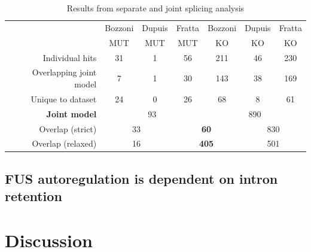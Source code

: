\begingroup
\renewcommand{\arraystretch}{1.5} 
\begin{table}[h!]
		\begin{tabular}{|r|ccc|ccc|}
			\hline
			& Bozzoni & Dupuis & Fratta & Bozzoni & Dupuis & Fratta\\[-0.3cm]
			& MUT & MUT & MUT & KO & KO & KO\\
			\hline
			Individual hits                & 31 & 1 & 56 & 211 & 46 & 230 \\
			Overlapping joint model & 7 & 1 & 30 & 143 & 38 & 169 \\
			Unique to dataset          & 24 & 0 & 26 & 68 & 8 & 61 \\
			\hline
			\textbf{Joint model}       & \multicolumn{3}{c|}{93} & \multicolumn{3}{c|}{890} \\
			\hline
			Overlap (strict)              & \multicolumn{2}{c|}{33} & \multicolumn{2}{c|}{\textbf{60}} & \multicolumn{2}{c|}{830} \\
			Overlap (relaxed)           & \multicolumn{2}{c|}{16} & \multicolumn{2}{c|}{\textbf{405} } & \multicolumn{2}{c|}{501} \\
			\hline
		\end{tabular}
	\caption{Results from separate and joint splicing analysis}
	\label{tab:splicing_results}
\end{table}
\endgroup

\subsection{FUS autoregulation is dependent on intron retention}


\clearpage
\section{Discussion}